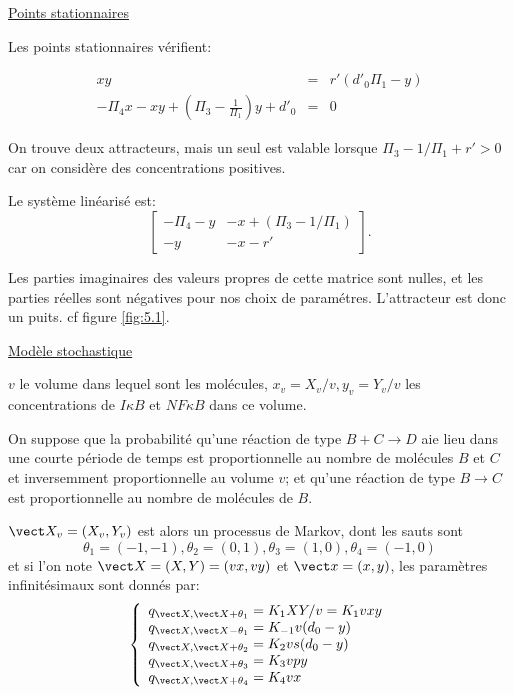\documentclass{article}
\begin{document}
\underline{Points stationnaires}

Les points stationnaires v{\'e}rifient:

\begin{eqnarray}
xy & = & r'(d'_0 \Pi_1-y)    \label{eq:S3} \\
-\Pi_4x-xy+(\Pi_3-\frac{1}{\Pi_1})y+d'_0 & = & 0 \label{eq:S4}
\end{eqnarray}

On trouve deux attracteurs, mais un seul est valable lorsque $\Pi_3-1/\Pi_1+r' > 0$ car on consid{\`e}re des concentrations positives.

Le syst{\`e}me lin{\'e}aris{\'e} est:
\[
\left[
\begin{array}{ll}
-\Pi_4-y& -x+(\Pi_3-1/\Pi_1) \\
-y & -x-r'
\end{array}
\right].
\]

Les parties imaginaires des valeurs propres de
 cette matrice sont nulles, et les parties
 r{\'e}elles sont n{\'e}gatives pour nos choix de
 param{\'e}tres. L'attracteur est donc un puits. cf figure \ref{fig:5.1}.

\underline{Mod{\`e}le stochastique}

$v$ le volume dans lequel sont les mol{\'e}cules,
 $x_v=X_v/v, y_v=Y_v/v$ les concentrations de $I\kappa B$ et
 $NF\kappa B$ dans ce volume.

On suppose que la probabilit{\'e} qu'une r{\'e}action de type $B+C\to D$ aie lieu dans une courte p{\'e}riode de temps est proportionnelle au nombre de mol{\'e}cules $B$ et $C$ et inversemment proportionnelle au volume $v$; et qu'une r{\'e}action de type $B\to C$ est proportionnelle au nombre de mol{\'e}cules de $B$.

$\vect X_v=(X_v,Y_v)$ est alors un processus de Markov, dont les sauts sont
\[
\theta_1=(-1,-1), \theta_2=(0,1), \theta_3=(1,0), \theta_4=(-1,0)
\]
et si l'on note $\vect X=(X,Y)=(vx,vy)$ et $\vect x=(x,y)$,
les param{\`e}tres infinit{\'e}simaux sont donn{\'e}s par:
\[
  \left \{
 \begin{array}{ll}
q_{\vect X,\vect X +\theta_1}  = K_1XY/v= K_1vxy  \\
q_{\vect X,\vect X -\theta_1}  = K_{-1}v(d_0-y) \\
q_{\vect X ,\vect X +\theta_2} = K_{2}vs(d_0-y) \\
q_{\vect X ,\vect X +\theta_3}  = K_{3}vpy     \\
q_{\vect X ,\vect X +\theta_4}  = K_4vx
\end{array} \right.
\]
\end{document}

